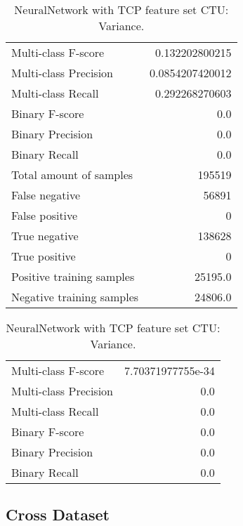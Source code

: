 \begin{table}[H]
\begin{minipage}{0.5\textwidth}
\caption{NeuralNetwork with TCP feature set CTU: \\Average.}
\centering
\begin{tabular}{l r}
\toprule
Multi-class F-score & 0.132202800215 \\
Multi-class Precision & 0.0854207420012 \\
Multi-class Recall & 0.292268270603 \\
\midrule
Binary F-score & 0.0 \\
Binary Precision & 0.0 \\
Binary Recall & 0.0 \\
\midrule
Total amount of samples & 195519 \\
False negative & 56891 \\
False positive & 0 \\
True negative & 138628 \\
True positive & 0 \\
\midrule
Positive training samples & 25195.0 \\
Negative training samples & 24806.0 \\
\bottomrule
\end{tabular}
\end{minipage}
\hfillx
\begin{minipage}{0.5\textwidth}
\caption{NeuralNetwork with TCP feature set CTU: \\Variance.}
\centering
\begin{tabular}{l r}
\toprule
Multi-class F-score & 7.70371977755e-34 \\
Multi-class Precision & 0.0 \\
Multi-class Recall & 0.0 \\
\midrule
Binary F-score & 0.0 \\
Binary Precision & 0.0 \\
Binary Recall & 0.0 \\
\bottomrule
\end{tabular}
\end{minipage}
\end{table}

\newpage
\subsection{Cross Dataset}

